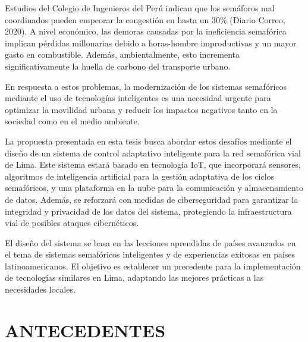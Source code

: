 \documentclass[12pt,a4paper,oneside]{report}
\begin{document}
Estudios del Colegio de Ingenieros del Perú indican que los semáforos mal coordinados pueden empeorar la congestión en hasta un 30\% (Diario Correo, 2020). A nivel económico, las demoras causadas por la ineficiencia semafórica implican pérdidas millonarias debido a horas-hombre improductivas y un mayor gasto en combustible. Además, ambientalmente, esto incrementa significativamente la huella de carbono del transporte urbano.

En respuesta a estos problemas, la modernización de los sistemas semafóricos mediante el uso de tecnologías inteligentes es una necesidad urgente para optimizar la movilidad urbana y reducir los impactos negativos tanto en la sociedad como en el medio ambiente.

La propuesta presentada en esta tesis busca abordar estos desafíos mediante el diseño de un sistema de control adaptativo inteligente para la red semafórica vial de Lima. Este sistema estará basado en tecnología IoT, que incorporará sensores, algoritmos de inteligencia artificial para la gestión adaptativa de los ciclos semafóricos, y una plataforma en la nube para la comunicación y almacenamiento de datos. Además, se reforzará con medidas de ciberseguridad para garantizar la integridad y privacidad de los datos del sistema, protegiendo la infraestructura vial de posibles ataques cibernéticos.

El diseño del sistema se basa en las lecciones aprendidas de países avanzados en el tema de sistemas semafóricos inteligentes y de experiencias exitosas en países latinoamericanos. El objetivo es establecer un precedente para la implementación de tecnologías similares en Lima, adaptando las mejores prácticas a las necesidades locales.

\chapter{ANTECEDENTES}\label{capuxedtulo-1-antecedentes}
\end{document}
